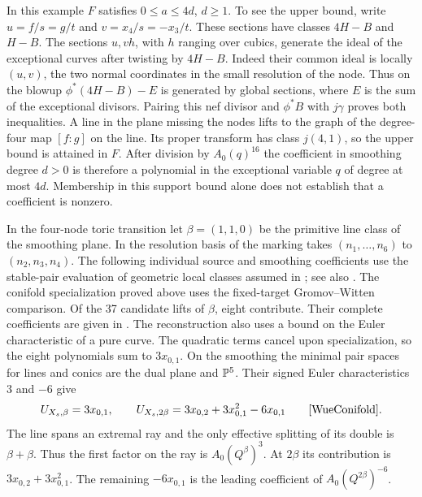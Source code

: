 In this example $F$ satisfies $0\le a\le 4d$, $d\ge1$. To see the
upper bound, write $u=f/s=g/t$ and $v=x_4/s=-x_3/t$. These sections
have classes $4H-B$ and $H-B$. The sections $u,vh$, with $h$ ranging
over cubics, generate the ideal of the exceptional curves after twisting
by $4H-B$. Indeed their common ideal is locally $(u,v)$, the two normal
coordinates in the small resolution of the node. Thus on the blowup
$\phi^*(4H-B)-E$ is generated by global sections, where $E$ is the
sum of the exceptional divisors. Pairing this nef divisor and $\phi^*B$
with $j\gamma$ proves both inequalities. A line in the plane missing
the nodes lifts to the graph of the degree-four map $[f:g]$ on the
line. Its proper transform has class $j(4,1)$, so the upper bound is
attained in $F$. After division by $A_0(q)^{16}$ the coefficient in
smoothing degree $d>0$ is therefore a polynomial in the exceptional
variable $q$ of degree at most $4d$. Membership in this support bound
alone does not establish that a coefficient is nonzero.

In the four-node toric transition let $\beta=(1,1,0)$ be the
primitive line class of the smoothing plane. In the resolution basis
of \cite[\S4]{WueConifold} the marking takes
$(n_1,\ldots,n_6)$ to $(n_2,n_3,n_4)$. The following individual source and smoothing coefficients use
the stable-pair evaluation of geometric local classes assumed in
\cite[\S\S5--6]{WueConifold}; see also \cite[Remark~1.8]{Pardon}.
The conifold specialization proved above uses the fixed-target
Gromov--Witten comparison. Of the 37 candidate lifts of
$\beta$, eight contribute. Their complete coefficients are given in
\cite[(21)--(24)]{WueConifold}. The reconstruction also uses a bound on the Euler characteristic of a pure curve. The quadratic terms cancel upon specialization, so
the eight polynomials sum to $3x_{0,1}$. On the smoothing the minimal
pair spaces for lines and conics are the dual plane and $\mathbb P^5$.
Their signed Euler characteristics $3$ and $-6$ give
\[
 U_{X_s,\beta}=3x_{0,1},\qquad
 U_{X_s,2\beta}=3x_{0,2}+3x_{0,1}^2-6x_{0,1}
 \qquad\text{\cite[Proposition~6.1]{WueConifold}}.
\]
The line spans an extremal ray and the only effective splitting of its
double is $\beta+\beta$. Thus the first factor on the ray is
$A_0(Q^\beta)^3$. At $2\beta$ its contribution is
$3x_{0,2}+3x_{0,1}^2$. The remaining $-6x_{0,1}$ is the leading
coefficient of $A_0(Q^{2\beta})^{-6}$.
